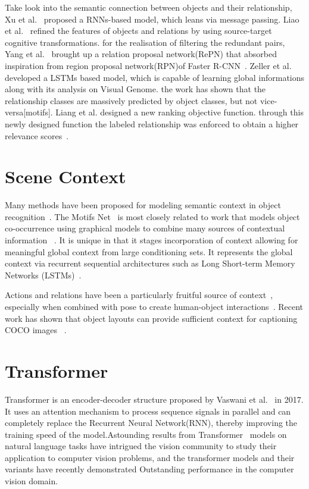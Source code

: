 Take look into the semantic connection between objects and their relationship, Xu et al.~\cite{xu2017scene} proposed a RNNs-based model,  which leans via message passing. Liao et al.~\cite{liao2019exploring} refined the features of objects and relations by using source-target cognitive transformations. for the realisation of filtering the redundant pairs, Yang et al.~\cite{yang2018graph} brought up a relation proposal network(RePN) that absorbed inspiration from region proposal network(RPN)of Faster R-CNN~\cite{ren2016faster}. Zeller et al.~\cite{zellers2018neural} developed a LSTMs based model, which is capable of learning global informations along with its analysis on Visual Genome. the work has shown that the relationship classes are massively predicted by object classes, but not vice-versa[motifs]. Liang et al. designed a new ranking objective function. through this newly designed function the labeled relationship was enforced to obtain a higher relevance scores~\cite{liang2018visual}.

\section{Scene Context}
Many methods have been proposed for modeling semantic context in object recognition~\cite{divvala2009empirical}. The Motifs Net~\cite{zellers2018neural} is most closely related to work that models object co-occurrence using graphical models to combine many sources of contextual information ~\cite{rabinovich2007objects,belongie2007context}. It is unique in that it stages incorporation of context allowing for meaningful global context from large conditioning sets. It represents the global context via recurrent sequential architectures such as Long Short-term Memory Networks (LSTMs)~\cite{hochreiter1997long}.

Actions and relations have been a particularly fruitful source of context~\cite{marszalek2009actions,gupta2015visual}, especially when combined with pose to create human-object interactions~\cite{yao2010modeling}. Recent work has shown that object layouts can provide sufficient context for captioning COCO images ~\cite{lin2014microsoft}.

\section{Transformer}
Transformer is an encoder-decoder structure proposed by Vaswani et al.~\cite{vaswani2017attention} in 2017. It uses an attention mechanism to process sequence signals in parallel and can completely replace the Recurrent Neural Network(RNN), thereby improving the training speed of the model.Astounding results from Transformer~\cite{vaswani2017attention} models on natural language tasks have intrigued the vision community to study their application to computer vision problems, and the transformer models and their variants have recently demonstrated Outstanding performance in the computer vision domain. 

